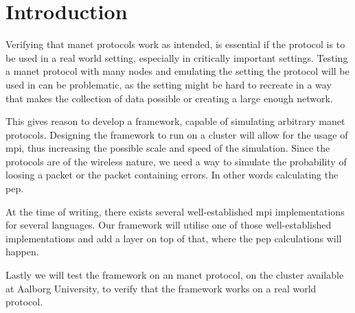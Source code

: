 \chapter{Introduction}
Verifying that \gls{manet} protocols work as intended, is essential if the protocol is to be used in a real world setting, especially in critically important settings. Testing a \gls{manet} protocol with many nodes and emulating the setting the protocol will be used in can be problematic, as the setting might be hard to recreate in a way that makes the collection of data possible or creating a large enough network.\medbreak


This gives reason to develop a framework, capable of simulating arbitrary \gls{manet} protocols. Designing the framework to run on a cluster will allow for the usage of \gls{mpi}, thus increasing the possible scale and speed of the simulation.
Since the protocols are of the wireless nature, we need a way to simulate the probability of loosing a packet or the packet containing errors. In other words calculating the \gls{pep}.

At the time of writing, there exists several well-established \gls{mpi} implementations for several languages. Our framework will utilise one of those well-established implementations and add a layer on top of that, where the \gls{pep} calculations will happen.

Lastly we will test the framework on an \gls{manet} protocol, on the cluster available at Aalborg University, to verify that the framework works on a real world protocol.